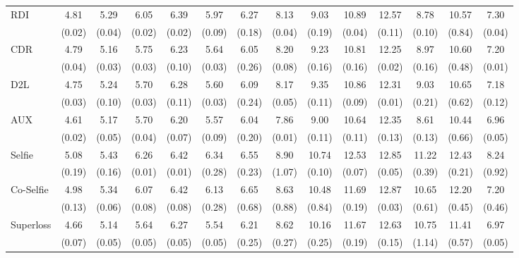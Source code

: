 \documentclass{article}
\theoremstyle{plain}
\theoremstyle{definition}
\theoremstyle{remark}
\begin{document}
\begin{table}[t]
\begin{center}
\begin{small}
{\begin{tabular}{lccccccccccccc}
        \multirow{2}{*}{RDI} & 4.81 & 5.29 & 6.05 & 6.39 & 5.97 & 6.27 & 8.13 & 9.03 & 10.89 & 12.57 & 8.78 & 10.57 & 7.30\\
            & (0.02) & (0.04) & (0.02) & (0.02) & (0.09) & (0.18) &	(0.04) & (0.19) & (0.04) & (0.11) & (0.10) & (0.84) & (0.04) \\
        \multirow{2}{*}{CDR} & 4.79 & 5.16 & 5.75 & 6.23 & 5.64 & 6.05 & 8.20 & 9.23 & 10.81 & 12.25 & 8.97 & 10.60 & 7.20\\
            & (0.04) & (0.03) & (0.03) & (0.10) & (0.03) & (0.26) &	(0.08) & (0.16) & (0.16) & (0.02) & (0.16) & (0.48) & (0.01)\\
        \multirow{2}{*}{D2L} & 4.75 & 5.24 & 5.70 & 6.28 & 5.60 & 6.09 & 8.17 & 9.35 & 10.86 & 12.31 & 9.03 & 10.65 & 7.18\\
            & (0.03) & (0.10) & (0.03) & (0.11) & (0.03) & (0.24) &	(0.05) & (0.11) & (0.09) & (0.01) & (0.21) & (0.62) & (0.12)\\
        \multirow{2}{*}{AUX} & 4.61 & 5.17 & 5.70 & 6.20 & 5.57 & 6.04 & 7.86 & 9.00 & 10.64 & 12.35 & 8.61 & 10.44 & 6.96\\
            & (0.02) & (0.05) & (0.04) & (0.07) & (0.09) & (0.20) &	(0.01) & (0.11) & (0.11) & (0.13) & (0.13) & (0.66) & (0.05) \\
        \multirow{2}{*}{Selfie} & 5.08 & 5.43 & 6.26 & 6.42 & 6.34 & 6.55 & 8.90 & 10.74 & 12.53 & 12.85 & 11.22 & 12.43 & 8.24\\
            & (0.19) & (0.16) & (0.01) & (0.01) & (0.28) & (0.23) &	(1.07) & (0.10) & (0.07) & (0.05) & (0.39) & (0.21) & (0.92)\\
        \multirow{2}{*}{Co-Selfie} & 4.98 & 5.34 & 6.07 & 6.42 & 6.13 & 6.65 & 8.63 & 10.48 & 11.69 & 12.87 & 10.65 & 12.20 & 7.20\\
            & (0.13) & (0.06) & (0.08) & (0.08) & (0.28) & (0.68) &	(0.88) & (0.84) & (0.19) & (0.03) & (0.61) & (0.45) & (0.46)\\
        \multirow{2}{*}{Superloss} & 4.66 & 5.14 & 5.64 & 6.27 & 5.54 & 6.21 & 8.62 & 10.16 & 11.67 & 12.63 & 10.75 & 11.41 & 6.97\\
            & (0.07) & (0.05) & (0.05) & (0.05) & (0.05) & (0.25) &	(0.27) & (0.25) & (0.19) & (0.15) & (1.14) & (0.57) & (0.05)\\
        

\end{tabular}}
\end{small}
\end{center}
\end{table}
\end{document}
